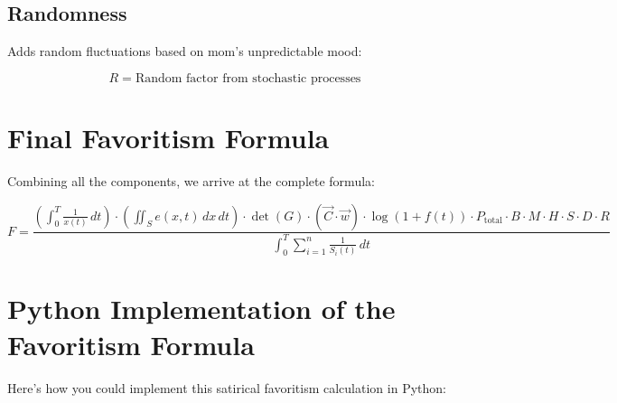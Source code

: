 \documentclass[12pt]{article}
\begin{document}
\subsection{Randomness}
Adds random fluctuations based on mom's unpredictable mood:

\begin{equation}
R = \text{Random factor from stochastic processes}
\end{equation}

\section{Final Favoritism Formula}

Combining all the components, we arrive at the complete formula:

\begin{equation}
F = \frac{\left( \displaystyle \int_0^T \frac{1}{x(t)} \, dt \right) \cdot \left( \displaystyle \iint_S e(x, t) \, dx \, dt \right) \cdot \det(G) \cdot \left( \vec{C} \cdot \vec{w} \right) \cdot \log(1 + f(t)) \cdot P_{\text{total}} \cdot B \cdot M \cdot H \cdot S \cdot D \cdot R}{\displaystyle \int_0^T \sum_{i=1}^{n} \frac{1}{S_i(t)} \, dt}
\end{equation}

\section{Python Implementation of the Favoritism Formula}

Here’s how you could implement this satirical favoritism calculation in Python:
\end{document}
